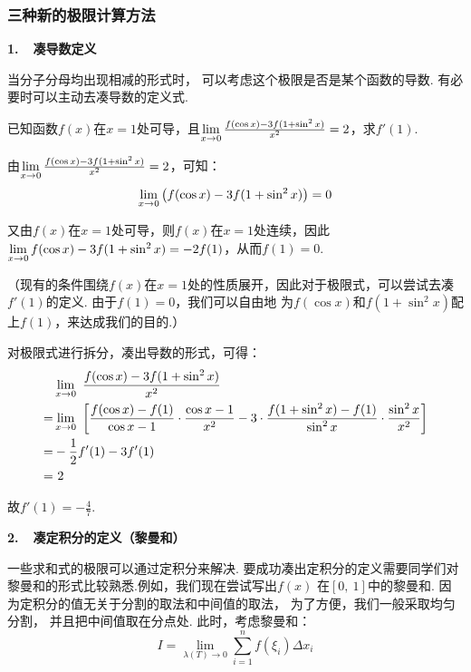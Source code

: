 \subsubsection{三种新的极限计算方法}
\textbf{1.~~凑导数定义}\vspace{0.25em}

当分子分母均出现相减的形式时，
可以考虑这个极限是否是某个函数的导数.
有必要时可以主动去凑导数的定义式.

\begin{example}
\label{ex:ch02-15}
已知函数$f(x)$在$x=1$处可导，且$\limx0 \frac{f(\cos x)-3f(1+\sin^{2}x)}{x^2}=2$，求$f'(1)$.
\end{example}

\begin{solution}
由$\limx0 \frac{f(\cos x)-3f(1+\sin^{2}x)}{x^2}=2$，可知：
$$
\limx0 \left(  f(\cos x)-3f(1+\sin^{2}x) \right)=0
$$

又由$f(x)$在$x=1$处可导，则$f(x)$在$x=1$处连续，因此$\limx0 f(\cos x)-3f(1+\sin^{2}x) = -2f(1)$，从而$f(1)=0$.\par
（现有的条件围绕$f(x)$在$x=1$处的性质展开，因此对于极限式，可以尝试去凑$f'(1)$的定义. 由于$f(1)=0$，我们可以自由地
为$f(\cos x)$和$f(1+\sin^{2} x)$配上$f(1)$，来达成我们的目的.）\par
对极限式进行拆分，凑出导数的形式，可得：
\begin{equation}
    \begin{aligned}
        &\limx0~\frac{f(\cos x)-3f(1+\sin^{2}x)}{x^2} \\
        = &\limx0~\left[\frac{f(\cos x)-f(1)}{\cos x -1}\cdot \frac{\cos x-1}{x^2} -
        3\cdot \frac{f(1+\sin^{2}x)-f(1)}{\sin^{2}x} \cdot \frac{\sin^2{x}}{x^2}
        \right] \\
        =&-\frac{1}{2}f'(1)-3f'(1)\\
        =&~2
        \nonumber
    \end{aligned}
\end{equation}\par
故$f'(1)=-\frac{4}{7}$.
\end{solution}

\textbf{2.~~凑定积分的定义（黎曼和）}\vspace{0.25em}

一些求和式的极限可以通过定积分来解决. 要成功凑出定积分的定义需要同学们对黎曼和的形式比较熟悉.例如，我们现在尝试写出$f(x)$
在$[0,~1]$中的黎曼和.
因为定积分的值无关于分割的取法和中间值的取法，
为了方便，我们一般采取均匀分割，
并且把中间值取在分点处.
此时，考虑黎曼和：
$$
I = \lim\limits_{\scriptscriptstyle\lambda(T)\to 0}\sum_{i=1}^{n}f(\xi_{i})\Delta x_{i}
$$

